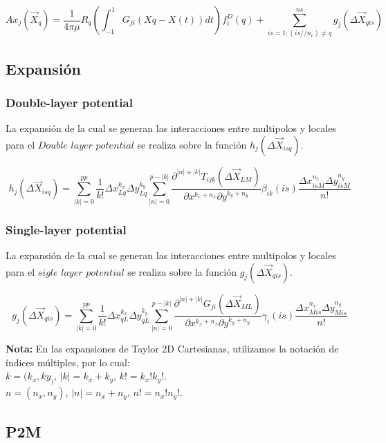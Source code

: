 \documentclass[letter,10pt]{article}
\begin{document}
\begin{equation}
Ax_j(\vec{X}_q) = \frac{1}{4\pi\mu}R_q\left(\int_{-1}^1 G_{ji}(Xq-X(t))dt\right)f_i^D(q)+ \sum_{is=1; {(is//n_c) \neq q}}^{ns}g_j(\Delta \vec{X}_{qis})
\label{P2PS-L}
\end{equation}

\subsection{Expansión}

\subsubsection{Double-layer potential}
La expansión de la cual se generan las interacciones entre multipolos y locales para el $Double$ $layer$ $potential$ se realiza sobre la función $h_j(\Delta \vec{X}_{isq})$.

\begin{equation}
h_j(\Delta \vec{X}_{isq}) = \sum^{pp}_{|k|=0}\frac{1}{k!}\Delta x_{Lq}^{k_x}\Delta y_{Lq}^{k_y}\sum_{|n|=0}^{p-|k|}\frac{\partial^{|n|+|k|}T_{ijk}(\Delta\vec{X}_{LM})}{\partial x^{k_x+n_x}\partial y^{k_y+n_y}}\beta_{ik}(is)\frac{\Delta x_{isM}^{n_x}\Delta y_{isM}^{n_y}}{n!}
\end{equation}

\subsubsection{Single-layer potential}
La expansión de la cual se generan las interacciones entre multipolos y locales para el $sigle$ $layer$ $potential$ se realiza sobre la función $g_j(\Delta \vec{X}_{qis})$.

\begin{equation}
g_j(\Delta \vec{X}_{qis}) = \sum^{pp}_{|k|=0}\frac{1}{k!}\Delta x_{qL}^{k_x}\Delta y_{qL}^{k_y}\sum_{|n|=0}^{p-|k|}\frac{\partial^{|n|+|k|}G_{ji}(\Delta\vec{X}_{ML})}{\partial x^{k_x+n_x}\partial y^{k_y+n_y}}\gamma_{i}(is)\frac{\Delta x_{Mis}^{n_x}\Delta y_{Mis}^{n_y}}{n!}
\end{equation}


\textbf{Nota:} En las expansiones de Taylor 2D Cartesianas, utilizamos la notación de índices múltiples, por lo cual:\\
\indent $k = (k_x,ky_)$, $|k| = k_x+k_y$, $k! = k_x!k_y!$.\\
\indent $n = (n_x,n_y)$, $|n| = n_x+n_y$, $n! = n_x!n_y!$.

\subsection{P2M}
\end{document}

